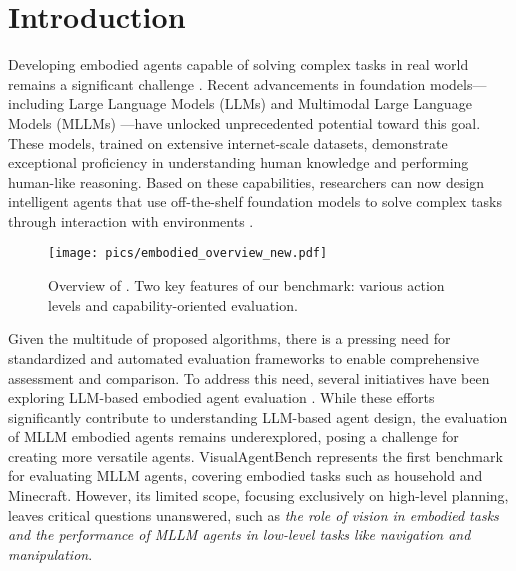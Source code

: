 \section{Introduction} \label{sec:intro}
Developing embodied agents capable of solving complex tasks in real world remains a significant challenge \cite{durante2024agent}. Recent advancements in foundation models—including Large Language Models (LLMs) \cite{GPT3,achiam2023gpt,touvron2023llama,yang2024qwen2} and Multimodal Large Language Models (MLLMs) \cite{GPT-4o,reid2024gemini,liu2024llavanext,wang2024qwen2,chen2023internvl,internvl2.5}—have unlocked unprecedented potential toward this goal. These models, trained on extensive internet-scale datasets, demonstrate exceptional proficiency in understanding human knowledge and performing human-like reasoning. Based on these capabilities, researchers can now design intelligent agents that use off-the-shelf foundation models to solve complex tasks through interaction with environments \cite{huang2022language,huang2022inner,huang2023voxposer,ahn2022can,llm-planner,singh2023progprompt,liang2023code,EscapeBench2024}.


\begin{figure*}[th!]
\begin{center}
\vspace{-5pt}
\texttt{[image: pics/embodied\_overview\_new.pdf]}
\end{center}
\vspace{-1.2em}
\caption{Overview of \name. Two key features of our benchmark: various action levels and capability-oriented evaluation.}\label{fig:overview}
\vspace{-1.5em}
\end{figure*}


Given the multitude of proposed algorithms, there is a pressing need for standardized and automated evaluation frameworks to enable comprehensive assessment and comparison.  To address this need, several initiatives have been exploring LLM-based embodied agent evaluation \cite{liu2023agentbench,choi2024lota,li2024embodied}. While these efforts significantly contribute to understanding LLM-based agent design, the evaluation of MLLM embodied agents remains underexplored, posing a challenge for creating more versatile agents. VisualAgentBench \cite{liu2024visualagentbench} represents the first benchmark for evaluating MLLM agents, covering embodied tasks such as household and Minecraft. However, its limited scope, focusing exclusively on high-level planning, leaves critical questions unanswered, such as \emph{the role of vision in embodied tasks and the performance of MLLM agents in low-level tasks like navigation and manipulation}. 



